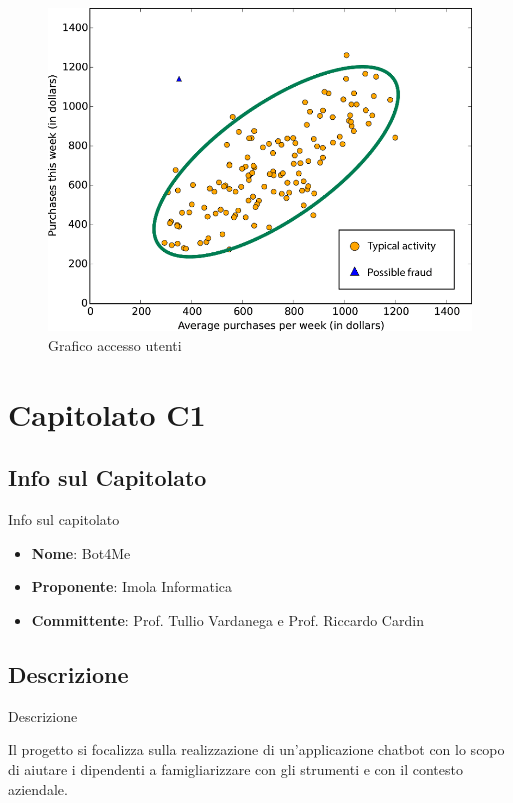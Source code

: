 \documentclass[11pt]{article}
\begin{document}
    \begin{figure}[h!]
        \centering
        \includegraphics[scale=0.4]{Res/LoginWarrior.png}
        \caption{Grafico accesso utenti}
        \label{zucchetti}
    \end{figure}


\newpage

\section{Capitolato C1}
    \subsection{Info sul Capitolato} Info sul capitolato
    \begin{itemize}
        \item \textbf{Nome}: Bot4Me
        \item \textbf{Proponente}: Imola Informatica
        \item \textbf{Committente}: Prof. Tullio Vardanega e Prof. Riccardo Cardin
    \end{itemize}
    \subsection{Descrizione} Descrizione
    
    Il progetto si focalizza sulla realizzazione di un’applicazione chatbot con lo scopo di aiutare i dipendenti a famigliarizzare con gli strumenti e con il contesto aziendale.
    
\end{document}
